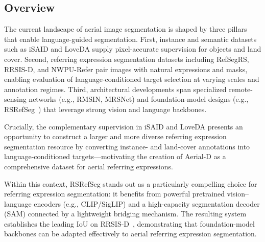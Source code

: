 \subsection{Overview}

The current landscape of aerial image segmentation is shaped by three pillars that enable language-guided segmentation. First, instance and semantic datasets such as iSAID and LoveDA supply pixel-accurate supervision for objects and land cover. Second, referring expression segmentation datasets including RefSegRS, RRSIS-D, and NWPU-Refer pair images with natural expressions and masks, enabling evaluation of language-conditioned target selection at varying scales and annotation regimes. Third, architectural developments span specialized remote-sensing networks (e.g., RMSIN, MRSNet) and foundation-model designs (e.g., RSRefSeg~\cite{chen2025rsrefseg}) that leverage strong vision and language backbones.

Crucially, the complementary supervision in iSAID and LoveDA presents an opportunity to construct a larger and more diverse referring expression segmentation resource by converting instance- and land-cover annotations into language-conditioned targets—motivating the creation of Aerial-D as a comprehensive dataset for aerial referring expressions.

Within this context, RSRefSeg stands out as a particularly compelling choice for referring expression segmentation: it benefits from powerful pretrained vision–language encoders (e.g., CLIP/SigLIP) and a high-capacity segmentation decoder (SAM) connected by a lightweight bridging mechanism. The resulting system establishes the leading IoU on RRSIS-D~\cite{chen2025rsrefseg}, demonstrating that foundation-model backbones can be adapted effectively to aerial referring expression segmentation.
